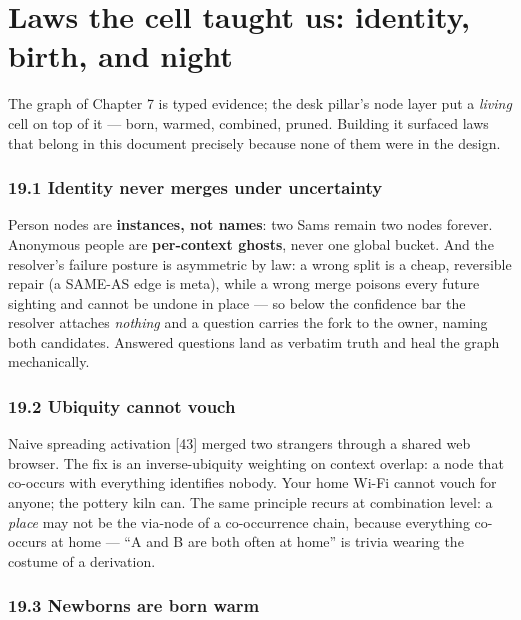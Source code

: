 \chapter{Laws the cell taught us: identity, birth, and night}\label{laws-the-cell-taught-us-identity-birth-and-night}

The graph of Chapter 7 is typed evidence; the desk pillar's node layer put a
\emph{living} cell on top of it --- born, warmed, combined, pruned. Building it
surfaced laws that belong in this document precisely because none of them were
in the design.

\subsection{19.1 Identity never merges under uncertainty}\label{identity-never-merges-under-uncertainty}

Person nodes are \textbf{instances, not names}: two Sams remain two nodes forever.
Anonymous people are \textbf{per-context ghosts}, never one global bucket. And the
resolver's failure posture is asymmetric by law: a wrong split is a cheap,
reversible repair (a SAME-AS edge is meta), while a wrong merge poisons every
future sighting and cannot be undone in place --- so below the confidence bar
the resolver attaches \emph{nothing} and a question carries the fork to the owner,
naming both candidates. Answered questions land as verbatim truth and heal the
graph mechanically.

\subsection{19.2 Ubiquity cannot vouch}\label{ubiquity-cannot-vouch}

Naive spreading activation {[}43{]} merged two strangers through a shared web
browser. The fix is an inverse-ubiquity weighting on context overlap: a node
that co-occurs with everything identifies nobody. Your home Wi-Fi cannot vouch
for anyone; the pottery kiln can. The same principle recurs at combination
level: a \emph{place} may not be the via-node of a co-occurrence chain, because
everything co-occurs at home --- ``A and B are both often at home'' is trivia
wearing the costume of a derivation.

\subsection{19.3 Newborns are born warm}\label{newborns-are-born-warm}

